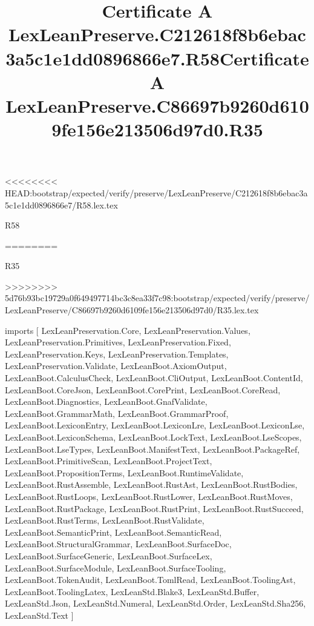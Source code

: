 <<<<<<<< HEAD:bootstrap/expected/verify/preserve/LexLeanPreserve/C212618f8b6ebac3a5c1e1dd0896866e7/R58.lex.tex
\begin{lexlean}{R58}
\title{Certificate A LexLeanPreserve.C212618f8b6ebac3a5c1e1dd0896866e7.R58}
========
\begin{lexlean}{R35}
\title{Certificate A LexLeanPreserve.C86697b9260d6109fe156e213506d97d0.R35}
>>>>>>>> 5d76b93bc19729a0f649497714bc3c8ea33f7c98:bootstrap/expected/verify/preserve/LexLeanPreserve/C86697b9260d6109fe156e213506d97d0/R35.lex.tex
\begin{coremodule}
imports [
  LexLeanPreservation.Core,
  LexLeanPreservation.Values,
  LexLeanPreservation.Primitives,
  LexLeanPreservation.Fixed,
  LexLeanPreservation.Keys,
  LexLeanPreservation.Templates,
  LexLeanPreservation.Validate,
  LexLeanBoot.AxiomOutput,
  LexLeanBoot.CalculusCheck,
  LexLeanBoot.CliOutput,
  LexLeanBoot.ContentId,
  LexLeanBoot.CoreJson,
  LexLeanBoot.CorePrint,
  LexLeanBoot.CoreRead,
  LexLeanBoot.Diagnostics,
  LexLeanBoot.GnafValidate,
  LexLeanBoot.GrammarMath,
  LexLeanBoot.GrammarProof,
  LexLeanBoot.LexiconEntry,
  LexLeanBoot.LexiconLre,
  LexLeanBoot.LexiconLse,
  LexLeanBoot.LexiconSchema,
  LexLeanBoot.LockText,
  LexLeanBoot.LseScopes,
  LexLeanBoot.LseTypes,
  LexLeanBoot.ManifestText,
  LexLeanBoot.PackageRef,
  LexLeanBoot.PrimitiveScan,
  LexLeanBoot.ProjectText,
  LexLeanBoot.PropositionTerms,
  LexLeanBoot.RuntimeValidate,
  LexLeanBoot.RustAssemble,
  LexLeanBoot.RustAst,
  LexLeanBoot.RustBodies,
  LexLeanBoot.RustLoops,
  LexLeanBoot.RustLower,
  LexLeanBoot.RustMoves,
  LexLeanBoot.RustPackage,
  LexLeanBoot.RustPrint,
  LexLeanBoot.RustSucceed,
  LexLeanBoot.RustTerms,
  LexLeanBoot.RustValidate,
  LexLeanBoot.SemanticPrint,
  LexLeanBoot.SemanticRead,
  LexLeanBoot.StructuralGrammar,
  LexLeanBoot.SurfaceDoc,
  LexLeanBoot.SurfaceGeneric,
  LexLeanBoot.SurfaceLex,
  LexLeanBoot.SurfaceModule,
  LexLeanBoot.SurfaceTooling,
  LexLeanBoot.TokenAudit,
  LexLeanBoot.TomlRead,
  LexLeanBoot.ToolingAst,
  LexLeanBoot.ToolingLatex,
  LexLeanStd.Blake3,
  LexLeanStd.Buffer,
  LexLeanStd.Json,
  LexLeanStd.Numeral,
  LexLeanStd.Order,
  LexLeanStd.Sha256,
  LexLeanStd.Text
]


\end{coremodule}
\end{lexlean}
\end{lexlean}
